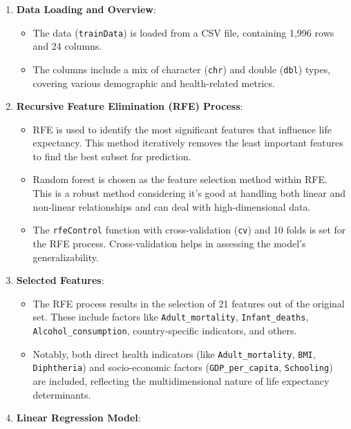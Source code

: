 \documentclass[
]{article}
\providecommand{\tightlist}{%
  \setlength{\itemsep}{0pt}\setlength{\parskip}{0pt}}
\begin{document}
\begin{enumerate}
\def\labelenumi{\arabic{enumi}.}
\tightlist
\item
  \textbf{Data Loading and Overview}:

  \begin{itemize}
  \tightlist
  \item
    The data (\texttt{trainData}) is loaded from a CSV file, containing
    1,996 rows and 24 columns.
  \item
    The columns include a mix of character (\texttt{chr}) and double
    (\texttt{dbl}) types, covering various demographic and
    health-related metrics.
  \end{itemize}
\item
  \textbf{Recursive Feature Elimination (RFE) Process}:

  \begin{itemize}
  \tightlist
  \item
    RFE is used to identify the most significant features that influence
    life expectancy. This method iteratively removes the least important
    features to find the best subset for prediction.
  \item
    Random forest is chosen as the feature selection method within RFE.
    This is a robust method considering it's good at handling both
    linear and non-linear relationships and can deal with
    high-dimensional data.
  \item
    The \texttt{rfeControl} function with cross-validation (\texttt{cv})
    and 10 folds is set for the RFE process. Cross-validation helps in
    assessing the model's generalizability.
  \end{itemize}
\item
  \textbf{Selected Features}:

  \begin{itemize}
  \tightlist
  \item
    The RFE process results in the selection of 21 features out of the
    original set. These include factors like \texttt{Adult\_mortality},
    \texttt{Infant\_deaths}, \texttt{Alcohol\_consumption},
    country-specific indicators, and others.
  \item
    Notably, both direct health indicators (like
    \texttt{Adult\_mortality}, \texttt{BMI}, \texttt{Diphtheria}) and
    socio-economic factors (\texttt{GDP\_per\_capita},
    \texttt{Schooling}) are included, reflecting the multidimensional
    nature of life expectancy determinants.
  \end{itemize}
\item
  \textbf{Linear Regression Model}:


\end{enumerate}
\end{document}
